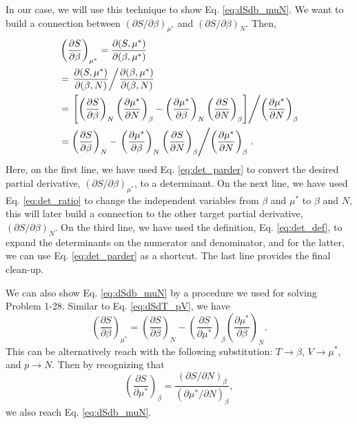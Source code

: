 \documentclass[twocolumn, 10pt]{article}
\numberwithin{equation}{section}
\begin{document}
In our case,
we will use this technique to show Eq. \eqref{eq:dSdb_muN}.
%
We want to build a connection between
$(\partial S/\partial \beta)_{\mu^*}$
and
$(\partial S/\partial \beta)_{N}$.
Then,
\begin{align*}
  &\left( \frac{ \partial S } {\partial \beta } \right)_{\mu^*}
  =
  \frac{ \partial (S, \mu^*) } { \partial (\beta, \mu^*) }
  \\
  &=
  \left.
  \frac{ \partial (S, \mu^*) } { \partial (\beta, N) }
  \middle/
  \frac{ \partial (\beta, \mu^*) } { \partial (\beta, N) }
  \right.
  \\
  &=
  \left.
  \left[
  \left( \frac{ \partial S } {\partial \beta } \right)_{N}
  \left( \frac{ \partial \mu^* } {\partial N } \right)_{\beta}
  -
  \left( \frac{ \partial \mu^* } {\partial \beta } \right)_{N}
  \left( \frac{ \partial S } {\partial N } \right)_{\beta}
  \right]
  \middle/
  \left( \frac{ \partial \mu^* } {\partial N } \right)_{\beta}
  \right.
  \\
  &=
  \left( \frac{ \partial S } {\partial \beta } \right)_{N}
  -
  \left.
  \left( \frac{ \partial \mu^* } {\partial \beta } \right)_{N}
  \left( \frac{ \partial S } {\partial N } \right)_{\beta}
  \middle/
  \left( \frac{ \partial \mu^* } {\partial N } \right)_{\beta}
  \right.
  .
\end{align*}
Here, on the first line, we have used Eq. \eqref{eq:det_parder}
to convert the desired partial derivative,
$(\partial S/\partial \beta)_{\mu^*}$,
to a determinant.
%
On the next line, we have used Eq. \eqref{eq:det_ratio}
to change the independent variables from $\beta$ and $\mu^*$
to $\beta$ and $N$,
this will later build a connection
to the other target partial derivative,
$(\partial S/\partial \beta)_N$.
%
On the third line, we have used the definition,
Eq. \eqref{eq:det_def},
to expand the determinants on the numerator and denominator,
and for the latter,
we can use Eq. \eqref{eq:det_parder} as a shortcut.
%
The last line provides the final clean-up.

We can also show Eq. \eqref{eq:dSdb_muN}
by a procedure we used for solving Problem 1-28.
%
Similar to Eq. \eqref{eq:dSdT_pV}, we have
$$
  \left( \frac{ \partial S } {\partial \beta } \right)_{\mu^*}
  =
  \left( \frac{ \partial S } {\partial \beta } \right)_{N}
  -
  \left( \frac{ \partial S } {\partial \mu^* } \right)_{\beta}
  \left( \frac{ \partial \mu^* } {\partial \beta } \right)_{N}
  .
$$
This can be alternatively reach
with the following substitution:
$T \to \beta$, $V \to \mu^*$, and $p \to N$.
%
Then by recognizing that
$$
\left( \frac{ \partial S } { \partial \mu^* } \right)_\beta
=
\frac{
  (\partial S / \partial N)_{\beta}
} {
  (\partial \mu^* / \partial N)_{\beta}
},
$$
we also reach Eq. \eqref{eq:dSdb_muN}.
\end{document}
